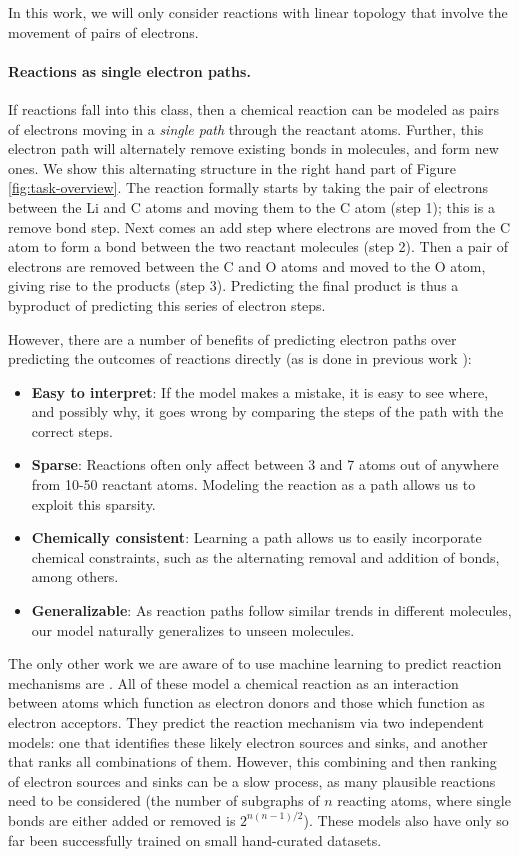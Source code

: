 In this work, we will only consider reactions with linear topology that involve the movement of pairs of electrons.


\paragraph{Reactions as single electron paths.}
If reactions fall into this class, then a chemical reaction can be modeled as pairs of electrons moving in a \emph{single path} through the reactant atoms. 
Further, this electron path will alternately remove existing bonds in molecules, and form new ones. We show this alternating structure in the right hand part of Figure \ref{fig:task-overview}. 
The reaction formally starts by taking the pair of electrons between the Li and C atoms and moving them to the C atom (step 1); this is a remove bond step. 
Next comes an add step where electrons are moved from the C atom to form a bond between the two reactant molecules (step 2).
Then a pair of electrons are removed between the C and O atoms and moved to the O atom, giving rise to the products (step 3). 
Predicting the final product is thus a byproduct of predicting this series of electron steps.

However, there are a number of benefits of predicting electron paths over predicting the outcomes of reactions directly (as is done in previous work \cite{jin2017predicting,schwaller2017found}):
\begin{itemize}
\item \textbf{Easy to interpret}: If the model makes a mistake, it is easy to see where, and possibly why, it goes wrong by comparing the steps of the path with the correct steps.
\item \textbf{Sparse}: Reactions often only affect between 3 and 7 atoms out of anywhere from 10-50 reactant atoms. Modeling the reaction as a path allows us to exploit this sparsity.
\item \textbf{Chemically consistent}: Learning a path allows us to easily incorporate chemical constraints, such as the alternating removal and addition of bonds, among others. 
\item \textbf{Generalizable}: As reaction paths follow similar trends in different molecules, our model naturally generalizes to unseen molecules. 
\end{itemize}
The only other work we are aware of to use machine learning to predict reaction mechanisms are \cite{fooshee2018deep,kayala2012reactionpredictor,NIPS2011_4356,kayala2011learning}.
All of these model a chemical reaction as an interaction between atoms which function as electron donors and those which function as electron acceptors.
 They predict the reaction mechanism via two independent models: one that identifies these likely electron sources and sinks, and another that ranks all combinations of them.
However, this combining and then ranking of electron sources and sinks can be a slow process, as many plausible reactions need to be considered (the number of subgraphs of $n$ reacting atoms, where single bonds are either added or removed is $2^{n(n-1)/2}$).
These models also have only so far been successfully trained on small hand-curated datasets.


